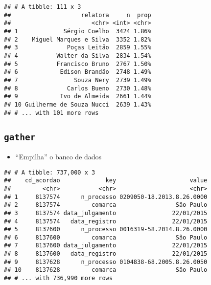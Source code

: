 \documentclass[]{book}
\newenvironment{Shaded}{\begin{snugshade}}{\end{snugshade}}
\newcommand{\KeywordTok}[1]{\textcolor[rgb]{0.13,0.29,0.53}{\textbf{{#1}}}}
\newcommand{\DataTypeTok}[1]{\textcolor[rgb]{0.13,0.29,0.53}{{#1}}}
\newcommand{\StringTok}[1]{\textcolor[rgb]{0.31,0.60,0.02}{{#1}}}
\newcommand{\OtherTok}[1]{\textcolor[rgb]{0.56,0.35,0.01}{{#1}}}
\newcommand{\NormalTok}[1]{{#1}}
\providecommand{\tightlist}{%
  \setlength{\itemsep}{0pt}\setlength{\parskip}{0pt}}
\begin{document}
\begin{Shaded}
\end{Shaded}

\begin{verbatim}
## # A tibble: 111 x 3
##                    relatora     n  prop
##                       <chr> <int> <chr>
## 1             Sérgio Coelho  3424 1.86%
## 2    Miguel Marques e Silva  3352 1.82%
## 3              Poças Leitão  2859 1.55%
## 4           Walter da Silva  2834 1.54%
## 5           Francisco Bruno  2767 1.50%
## 6            Edison Brandão  2748 1.49%
## 7                Souza Nery  2739 1.49%
## 8              Carlos Bueno  2730 1.48%
## 9            Ivo de Almeida  2661 1.44%
## 10 Guilherme de Souza Nucci  2639 1.43%
## # ... with 101 more rows
\end{verbatim}

\subsection{\texorpdfstring{\texttt{gather}}{gather}}\label{gather}

\begin{itemize}
\tightlist
\item
  ``Empilha'' o banco de dados
\end{itemize}

\begin{Shaded}
\end{Shaded}

\begin{verbatim}
## # A tibble: 737,000 x 3
##    cd_acordao             key                     value
##         <chr>           <chr>                     <chr>
## 1     8137574      n_processo 0209050-18.2013.8.26.0000
## 2     8137574         comarca                 São Paulo
## 3     8137574 data_julgamento                22/01/2015
## 4     8137574   data_registro                22/01/2015
## 5     8137600      n_processo 0016319-58.2014.8.26.0000
## 6     8137600         comarca                 São Paulo
## 7     8137600 data_julgamento                22/01/2015
## 8     8137600   data_registro                22/01/2015
## 9     8137628      n_processo 0104838-68.2005.8.26.0050
## 10    8137628         comarca                 São Paulo
## # ... with 736,990 more rows
\end{verbatim}
\end{document}
